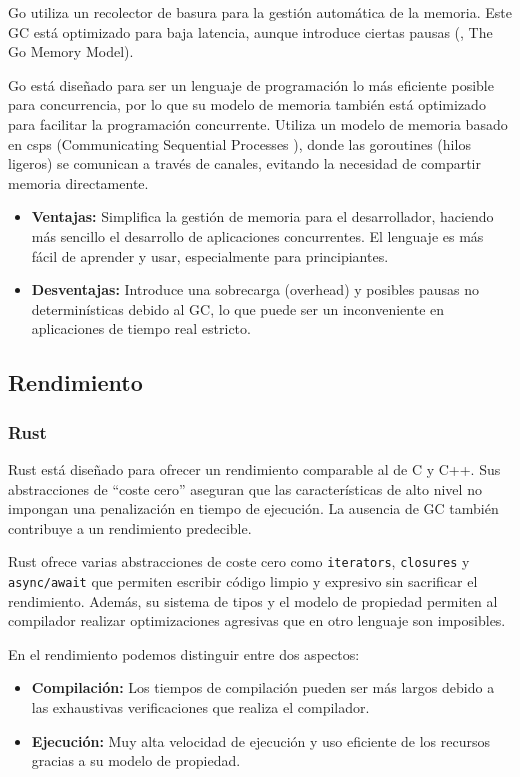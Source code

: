 Go utiliza un recolector de basura para la gestión automática de la memoria. Este GC está optimizado para baja latencia, aunque introduce ciertas pausas (\cite{go-documentation}, The Go Memory Model).

Go está diseñado para ser un lenguaje de programación lo más eficiente posible para concurrencia, por lo que su modelo de memoria también está optimizado para facilitar la programación concurrente. Utiliza un modelo de memoria basado en \glspl{csp} (Communicating Sequential Processes \cite{communicating-sequential-processes}), donde las goroutines (hilos ligeros) se comunican a través de canales, evitando la necesidad de compartir memoria directamente.
\begin{itemize}
    \item \textbf{Ventajas:} Simplifica la gestión de memoria para el desarrollador, haciendo más sencillo el desarrollo de aplicaciones concurrentes. El lenguaje es más fácil de aprender y usar, especialmente para principiantes.
    \item \textbf{Desventajas:} Introduce una sobrecarga (overhead) y posibles pausas no determinísticas debido al GC, lo que puede ser un inconveniente en aplicaciones de tiempo real estricto.
\end{itemize}

\subsection{Rendimiento}
\subsubsection{Rust}
Rust está diseñado para ofrecer un rendimiento comparable al de C y C++. Sus abstracciones de ``coste cero'' aseguran que las características de alto nivel no impongan una penalización en tiempo de ejecución. La ausencia de GC también contribuye a un rendimiento predecible.

Rust ofrece varias abstracciones de coste cero como \texttt{iterators}, \texttt{closures} y \texttt{async/await} que permiten escribir código limpio y expresivo sin sacrificar el rendimiento. Además, su sistema de tipos y el modelo de propiedad permiten al compilador realizar optimizaciones agresivas que en otro lenguaje son imposibles.

En el rendimiento podemos distinguir entre dos aspectos:
\begin{itemize}
    \item \textbf{Compilación:} Los tiempos de compilación pueden ser más largos debido a las exhaustivas verificaciones que realiza el compilador.
    \item \textbf{Ejecución:} Muy alta velocidad de ejecución y uso eficiente de los recursos gracias a su modelo de propiedad.
\end{itemize}

